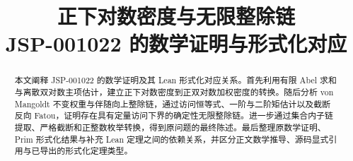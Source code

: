 \documentclass[UTF8,11pt,a4paper,scheme=plain,leqno]{ctexart}
\title{\large\bfseries 正下对数密度与无限整除链\\JSP-001022 的数学证明与形式化对应}
\author{}
\date{}
\numberwithin{equation}{section}
\theoremstyle{chineseplain}
\begin{document}
\maketitle
\begin{abstract}
本文阐释 JSP-001022 的数学证明及其 Lean 形式化对应关系。首先利用有限 Abel 求和与离散双对数主项估计，建立正下对数密度到正双对数加权密度的转换。随后分析 von Mangoldt 不变权重与伴随向上整除链，通过访问恒等式、一阶与二阶矩估计以及截断反向 Fatou，证明存在具有定量访问下界的确定性无限整除链。进一步通过集合内子链提取、严格截断和正整数枚举转换，得到原问题的最终陈述。最后整理原数学证明、Prim 形式化结果与补充 Lean 定理之间的依赖关系，并区分正文数学推导、源码显式引用与已导出的形式化定理类型。
\end{abstract}






\clearpage


\end{document}
